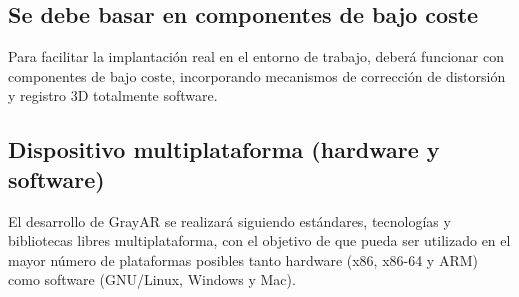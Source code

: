 \subsection{Se debe basar en componentes de bajo coste}
Para facilitar la implantación real en el entorno de trabajo, deberá funcionar con componentes de bajo coste, incorporando mecanismos de corrección de distorsión y registro 3D totalmente software.

\subsection{Dispositivo multiplataforma (hardware y software)}
El desarrollo de GrayAR se realizará siguiendo estándares, tecnologías y bibliotecas libres multiplataforma, con el objetivo de que pueda ser utilizado en el mayor número de plataformas posibles tanto  hardware (x86, x86-64 y ARM) como software (GNU/Linux, Windows y Mac).




